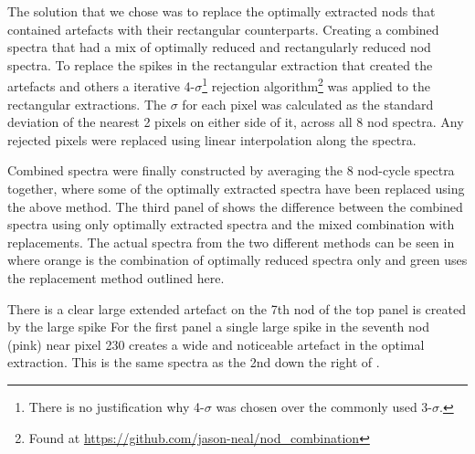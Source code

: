 The solution that we chose was to replace the optimally extracted nods that contained artefacts with their rectangular counterparts. Creating a combined spectra that had a mix of optimally reduced and rectangularly reduced nod spectra.
To replace the spikes in the rectangular extraction that created the artefacts and others a iterative 4-\(\sigma\)\footnote{There is no justification why 4-\(\sigma\) was chosen over the commonly used 3-\(\sigma\).} rejection algorithm\footnote{Found at \url{https://github.com/jason-neal/nod_combination}} was applied to the rectangular extractions. The \(\sigma\) for each pixel was calculated as the standard deviation of the nearest 2 pixels on either side of it, across all 8 nod spectra. Any rejected pixels were replaced using linear interpolation along the spectra.


Combined spectra were finally constructed by averaging the 8 nod-cycle spectra together, where some of the optimally extracted spectra have been replaced using the above method. The third panel of  shows the difference between the combined spectra using only optimally extracted spectra and the mixed combination with replacements. The actual spectra from the two different methods can be seen in  where orange is the combination of optimally reduced spectra only and green uses the replacement method outlined here.

There is a clear large extended artefact on the 7th nod of the top panel is created by the large spike For the first panel a single large spike in the seventh nod (pink) near pixel 230 creates a wide and noticeable artefact in the optimal extraction. This is the same spectra as the 2nd down the right of .



